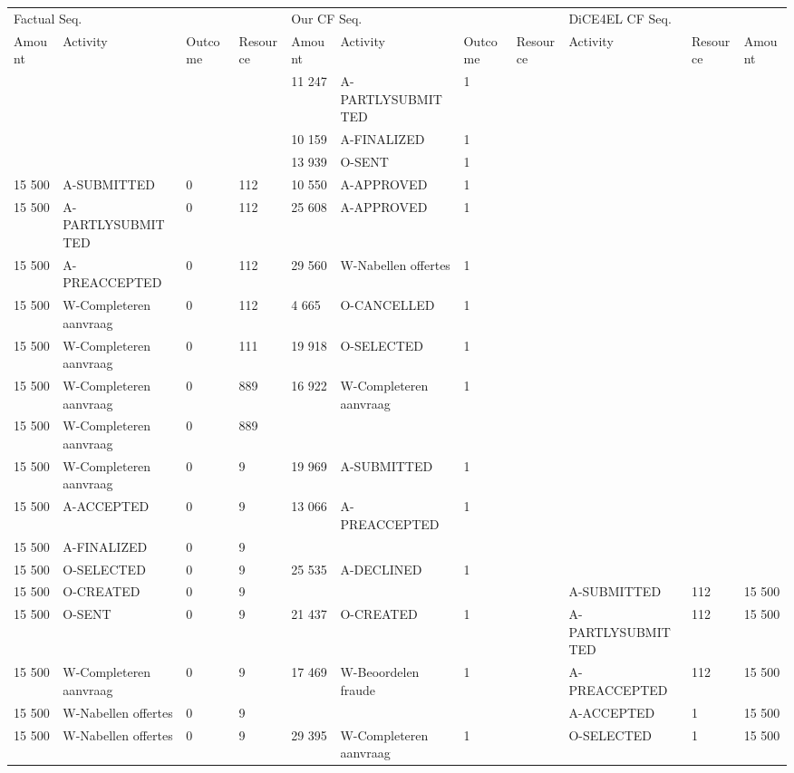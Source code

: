 \begin{tabular}{lllllllllll}
\toprule
\multicolumn{4}{l}{Factual Seq.} & \multicolumn{4}{l}{Our CF Seq.} & \multicolumn{3}{l}{DiCE4EL CF Seq.} \\
Amount & Activity & Outcome & Resource & Amount & Activity & Outcome & Resource & Activity & Resource & Amount \\
\midrule
 &  &  &  & 11 247 & A-PARTLYSUBMITTED & 1 &  &  &  &  \\
 &  &  &  & 10 159 & A-FINALIZED & 1 &  &  &  &  \\
 &  &  &  & 13 939 & O-SENT & 1 &  &  &  &  \\
15 500 & A-SUBMITTED & 0 & 112 & 10 550 & A-APPROVED & 1 &  &  &  &  \\
15 500 & A-PARTLYSUBMITTED & 0 & 112 & 25 608 & A-APPROVED & 1 &  &  &  &  \\
15 500 & A-PREACCEPTED & 0 & 112 & 29 560 & W-Nabellen offertes & 1 &  &  &  &  \\
15 500 & W-Completeren aanvraag & 0 & 112 & 4 665 & O-CANCELLED & 1 &  &  &  &  \\
15 500 & W-Completeren aanvraag & 0 & 111 & 19 918 & O-SELECTED & 1 &  &  &  &  \\
15 500 & W-Completeren aanvraag & 0 & 889 & 16 922 & W-Completeren aanvraag & 1 &  &  &  &  \\
15 500 & W-Completeren aanvraag & 0 & 889 &  &  &  &  &  &  &  \\
15 500 & W-Completeren aanvraag & 0 & 9 & 19 969 & A-SUBMITTED & 1 &  &  &  &  \\
15 500 & A-ACCEPTED & 0 & 9 & 13 066 & A-PREACCEPTED & 1 &  &  &  &  \\
15 500 & A-FINALIZED & 0 & 9 &  &  &  &  &  &  &  \\
15 500 & O-SELECTED & 0 & 9 & 25 535 & A-DECLINED & 1 &  &  &  &  \\
15 500 & O-CREATED & 0 & 9 &  &  &  &  & A-SUBMITTED & 112 & 15 500 \\
15 500 & O-SENT & 0 & 9 & 21 437 & O-CREATED & 1 &  & A-PARTLYSUBMITTED & 112 & 15 500 \\
15 500 & W-Completeren aanvraag & 0 & 9 & 17 469 & W-Beoordelen fraude & 1 &  & A-PREACCEPTED & 112 & 15 500 \\
15 500 & W-Nabellen offertes & 0 & 9 &  &  &  &  & A-ACCEPTED & 1 & 15 500 \\
15 500 & W-Nabellen offertes & 0 & 9 & 29 395 & W-Completeren aanvraag & 1 &  & O-SELECTED & 1 & 15 500 \\

\end{tabular}
